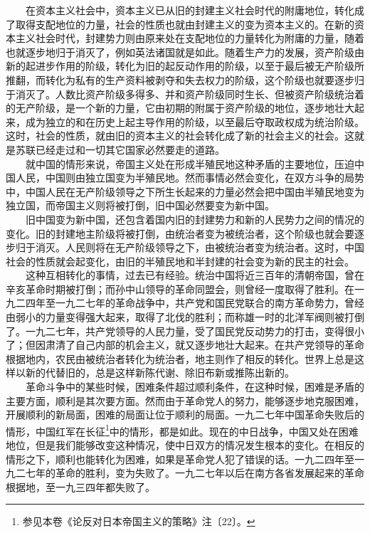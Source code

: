 \documentclass[cn,11pt,chinese]{elegantbook}
\begin{document}
　　在资本主义社会中，资本主义已从旧的封建主义社会时代的附庸地位，转化成了取得支配地位的力量，社会的性质也就由封建主义的变为资本主义的。在新的资本主义社会时代，封建势力则由原来处在支配地位的力量转化为附庸的力量，随着也就逐步地归于消灭了，例如英法诸国就是如此。随着生产力的发展，资产阶级由新的起进步作用的阶级，转化为旧的起反动作用的阶级，以至于最后被无产阶级所推翻，而转化为私有的生产资料被剥夺和失去权力的阶级，这个阶级也就要逐步归于消灭了。人数比资产阶级多得多、并和资产阶级同时生长、但被资产阶级统治着的无产阶级，是一个新的力量，它由初期的附属于资产阶级的地位，逐步地壮大起来，成为独立的和在历史上起主导作用的阶级，以至最后夺取政权成为统治阶级。这时，社会的性质，就由旧的资本主义的社会转化成了新的社会主义的社会。这就是苏联已经走过和一切其它国家必然要走的道路。\\
　　就中国的情形来说，帝国主义处在形成半殖民地这种矛盾的主要地位，压迫中国人民，中国则由独立国变为半殖民地。然而事情必然会变化，在双方斗争的局势中，中国人民在无产阶级领导之下所生长起来的力量必然会把中国由半殖民地变为独立国，而帝国主义则将被打倒，旧中国必然要变为新中国。\\
　　旧中国变为新中国，还包含着国内旧的封建势力和新的人民势力之间的情况的变化。旧的封建地主阶级将被打倒，由统治者变为被统治者，这个阶级也就会要逐步归于消灭。人民则将在无产阶级领导之下，由被统治者变为统治者。这时，中国社会的性质就会起变化，由旧的半殖民地和半封建的社会变为新的民主的社会。\\
　　这种互相转化的事情，过去已有经验。统治中国将近三百年的清朝帝国，曾在辛亥革命时期被打倒；而孙中山领导的革命同盟会，则曾经一度取得了胜利。在一九二四年至一九二七年的革命战争中，共产党和国民党联合的南方革命势力，曾经由弱小的力量变得强大起来，取得了北伐的胜利；而称雄一时的北洋军阀则被打倒了。一九二七年，共产党领导的人民力量，受了国民党反动势力的打击，变得很小了；但因肃清了自己内部的机会主义，就又逐步地壮大起来。在共产党领导的革命根据地内，农民由被统治者转化为统治者，地主则作了相反的转化。世界上总是这样以新的代替旧的，总是这样新陈代谢、除旧布新或推陈出新的。\\
　　革命斗争中的某些时候，困难条件超过顺利条件，在这种时候，困难是矛盾的主要方面，顺利是其次要方面。然而由于革命党人的努力，能够逐步地克服困难，开展顺利的新局面，困难的局面让位于顺利的局面。一九二七年中国革命失败后的情形，中国红军在长征\footnote[24]{ 参见本卷《论反对日本帝国主义的策略》注〔22〕。}中的情形，都是如此。现在的中日战争，中国又处在困难地位，但是我们能够改变这种情况，使中日双方的情况发生根本的变化。在相反的情形之下，顺利也能转化为困难，如果是革命党人犯了错误的话。一九二四年至一九二七年的革命的胜利，变为失败了。一九二七年以后在南方各省发展起来的革命根据地，至一九三四年都失败了。\\
\end{document}
